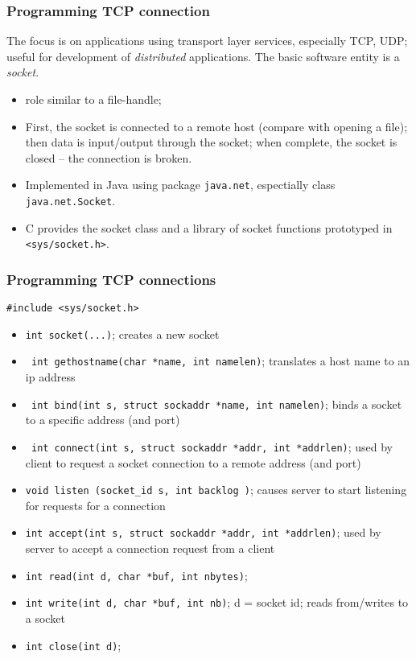 \documentclass[10pt, hyperref={pdfpagelabels=false}]{beamer}
\begin{document}
\begin{frame}
\frametitle{Programming TCP connection}
The focus is on applications using transport layer services, especially TCP, UDP; useful for development of \emph{distributed} applications. The basic software entity is a \emph{\color{blue}socket}.
\begin{itemize}
\item role similar to a file-handle;
\item First, the socket is connected to a remote host (compare with opening a file); then data is input/output through the socket; when complete, the socket is closed – the connection is broken.
\item Implemented in Java using package \texttt{java.net}, espectially class \texttt{java.net.Socket}.
\item C provides the socket class and a library of socket functions prototyped in \texttt{<sys/socket.h>}.
\end{itemize}
\end{frame}

\begin{frame}
\frametitle{Programming TCP connections}
\texttt{\#include <sys/socket.h>}
\begin{itemize}
\item \texttt{\color{blue}int socket(...)}; creates a new socket
\item \texttt{\color{blue} int gethostname(char *name, int namelen)}; translates a host name to an ip address
\item \texttt{\color{blue} int bind(int s, struct sockaddr *name, int namelen)}; binds a socket to a specific address (and port)
\item \texttt{\color{blue} int connect(int s, struct sockaddr *addr, int *addrlen)}; used by client to request a socket connection to a remote address (and port)
\item \texttt{\color{blue}void listen (socket\_id s, int backlog )}; causes server to start listening for requests for a connection
\item \texttt{\color{blue}int accept(int s, struct sockaddr *addr, int *addrlen)}; used by server to accept a connection request from a client
\item \texttt{\color{blue}int read(int d, char *buf, int nbytes)};
\item \texttt{\color{blue}int write(int d, char *buf, int nb)}; d = socket id; reads from/writes to a socket
\item \texttt{\color{blue}int close(int d)};
\end{itemize}
\end{frame}
\end{document}
